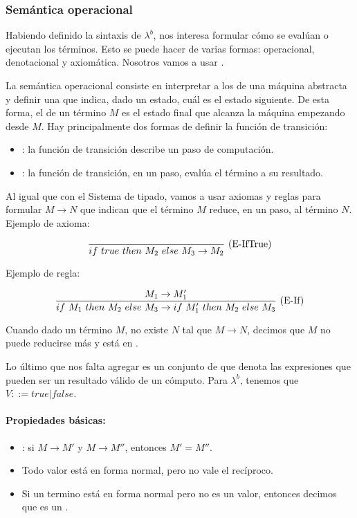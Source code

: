 \subsubsection{Semántica operacional}

Habiendo definido la sintaxis de $\lambda^b$, nos interesa formular cómo se evalúan o ejecutan los términos. Esto se puede hacer de varias formas: operacional, denotacional y axiomática. Nosotros vamos a usar .

La semántica operacional consiste en interpretar a los  de una máquina abstracta y definir una  que indica, dado un estado, cuál es el estado siguiente. De esta forma, el  de un término $M$ es el estado final que alcanza la máquina empezando desde $M$. Hay principalmente dos formas de definir la función de transición:

\begin{itemize}
  \item {}: la función de transición describe un paso de computación.
  \item {}: la función de transición, en un paso, evalúa el término a su resultado.
\end{itemize}

Al igual que con el Sistema de tipado, vamos a usar axiomas y reglas para formular  $M\to N$ que indican que el término $M$ reduce, en un paso, al término $N$. Ejemplo de axioma:

\[\frac{}{if\ true\ then\ M_2\ else\ M_3 \to M_2}\ \text{(E-IfTrue)}\]

Ejemplo de regla:

\[\frac{M_1 \to M_1'}{if\ M_1\ then\ M_2\ else\ M_3 \to if\ M_1'\ then\ M_2\ else\ M_3}\ \text{(E-If)}\]

Cuando dado un término $M$, no existe $N$ tal que $M\to N$, decimos que $M$ no puede reducirse más y está en .

Lo último que nos falta agregar es un conjunto de  que denota las expresiones que pueden ser un resultado válido de un cómputo. Para $\lambda^b$, tenemos que $V ::= true \vert false$.

\paragraph{Propiedades básicas:}

\begin{itemize}
  \item {}: si $M \to M'$ y $M \to M''$, entonces $M'= M''$.
  \item Todo valor está en forma normal, pero no vale el recíproco.
  \item Si un termino está en forma normal pero no es un valor, entonces decimos que es un .
\end{itemize}

